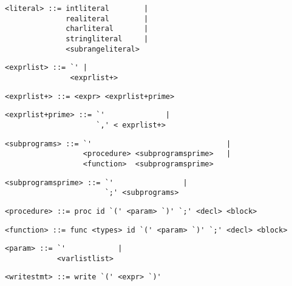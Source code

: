 \begin{footnotesize}
\begin{lstlisting}[frame=single, label={literal}, language=pie]
<literal> ::= intliteral        | 
              realiteral        | 
              charliteral       |
              stringliteral     |
              <subrangeliteral>
\end{lstlisting}

\begin{lstlisting}[frame=single, label={exprlist}, language=pie]
<exprlist> ::= `' | 
               <exprlist+>
\end{lstlisting}

\begin{lstlisting}[frame=single, label={exprlist+}, language=pie]
<exprlist+> ::= <expr> <exprlist+prime> 
\end{lstlisting}

\begin{lstlisting}[frame=single, label={exprlist+prime}, language=pie]
<exprlist+prime> ::= `'              |
                     `,' < exprlist+> 
\end{lstlisting}

\begin{lstlisting}[frame=single, label={subprograms}, language=pie]
<subprograms> ::= `'                               |
                  <procedure> <subprogramsprime>   |
                  <function>  <subprogramsprime>
\end{lstlisting}

\begin{lstlisting}[frame=single, label={subprogramsprime}, language=pie]
<subprogramsprime> ::= `'                |
                       `;' <subprograms>
\end{lstlisting}

\begin{lstlisting}[frame=single, label={procedure}, language=pie]
<procedure> ::= proc id `(' <param> `)' `;' <decl> <block> 
\end{lstlisting}

\begin{lstlisting}[frame=single, label={function}, language=pie]
<function> ::= func <types> id `(' <param> `)' `;' <decl> <block>
\end{lstlisting}

\begin{lstlisting}[frame=single, label={param}, language=pie]
<param> ::= `'            |
            <varlistlist>
\end{lstlisting}

\begin{lstlisting}[frame=single, label={writestmt}, language=pie]
<writestmt> ::= write `(' <expr> `)'
\end{lstlisting}


\end{footnotesize}
